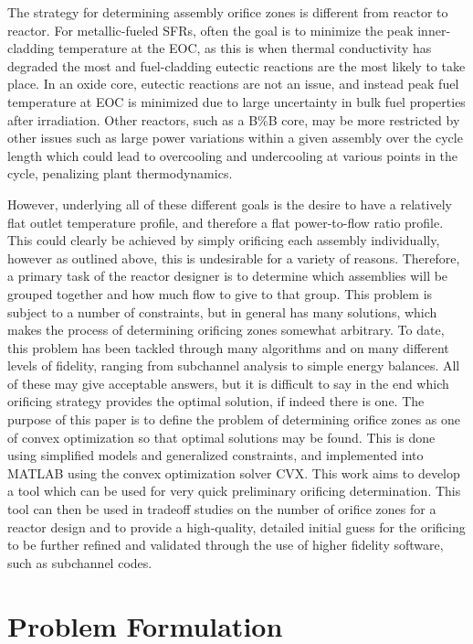 \documentclass[11pt, oneside]{article}   	%
\begin{document}
The strategy for determining assembly orifice zones is different from reactor to reactor.
For metallic-fueled SFRs, often the goal is to minimize the peak inner-cladding temperature at the EOC, as this is when thermal conductivity has degraded the most and fuel-cladding eutectic reactions are the most likely to take place.
In an oxide core, eutectic reactions are not an issue, and instead peak fuel temperature at EOC is minimized due to large uncertainty in bulk fuel properties after irradiation.
Other reactors, such as a B\%B core, may be more restricted by other issues such as large power variations within a given assembly over the cycle length which could lead to overcooling and undercooling at various points in the cycle, penalizing plant thermodynamics.

However, underlying all of these different goals is the desire to have a relatively flat outlet temperature profile, and therefore a flat power-to-flow ratio profile.
This could clearly be achieved by simply orificing each assembly individually, however as outlined above, this is undesirable for a variety of reasons.
Therefore, a primary task of the reactor designer is to determine which assemblies will be grouped together and how much flow to give to that group.
This problem is subject to a number of constraints, but in general has many solutions, which makes the process of determining orificing zones somewhat arbitrary.
To date, this problem has been tackled through many algorithms and on many different levels of fidelity, ranging from subchannel analysis to simple energy balances.
All of these may give acceptable answers, but it is difficult to say in the end which orificing strategy provides the optimal solution, if indeed there is one.
The purpose of this paper is to define the problem of determining orifice zones as one of convex optimization so that optimal solutions may be found.
This is done using simplified models and generalized constraints, and implemented into MATLAB using the convex optimization solver CVX.
This work aims to develop a tool which can be used for very quick preliminary orificing determination.
This tool can then be used in tradeoff studies on the number of orifice zones for a reactor design and to provide a high-quality, detailed initial guess for the orificing to be further refined and validated through the use of higher fidelity software, such as subchannel codes.

\section{Problem Formulation}
\end{document}

